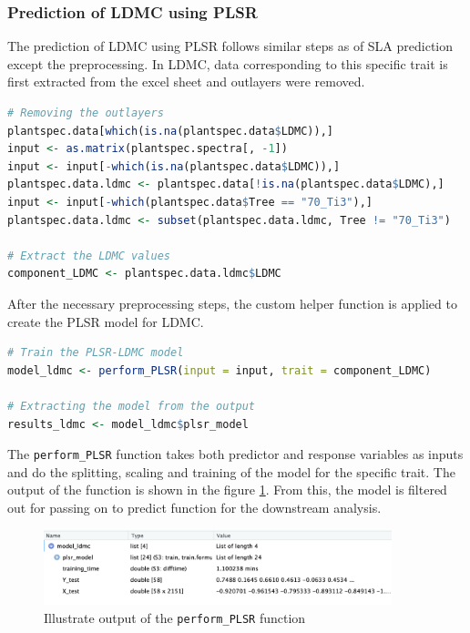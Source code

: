 \documentclass[12pt,a4paper]{report}
\begin{document}
\subsubsection*{Prediction of LDMC using PLSR}
The prediction of LDMC using PLSR follows similar steps as of SLA prediction except the preprocessing. In LDMC, data corresponding to this specific trait is first extracted from the excel sheet and outlayers were removed.

\begin{lstlisting}[language=R, style=mystyle]
# Removing the outlayers
plantspec.data[which(is.na(plantspec.data$LDMC)),]
input <- as.matrix(plantspec.spectra[, -1])
input <- input[-which(is.na(plantspec.data$LDMC)),]
plantspec.data.ldmc <- plantspec.data[!is.na(plantspec.data$LDMC),]
input <- input[-which(plantspec.data$Tree == "70_Ti3"),]
plantspec.data.ldmc <- subset(plantspec.data.ldmc, Tree != "70_Ti3")

# Extract the LDMC values
component_LDMC <- plantspec.data.ldmc$LDMC
\end{lstlisting}

After the necessary preprocessing steps, the custom helper function is applied to create the PLSR model for LDMC.

\begin{lstlisting}[language=R, style=mystyle]
# Train the PLSR-LDMC model
model_ldmc <- perform_PLSR(input = input, trait = component_LDMC)

# Extracting the model from the output
results_ldmc <- model_ldmc$plsr_model
\end{lstlisting}

The \texttt{perform\_PLSR} function takes both predictor and response variables as inputs and do the splitting, scaling and training of the model for the specific trait. The output of the function is shown in the figure \ref{fig:model_ldmc}. From this, the model is filtered out for passing on to predict function for the downstream analysis.

\begin{figure}[h]
    \centering
    \includegraphics[width=0.9\textwidth]{Figures/model_ldmc.png}
    \caption{Illustrate output of the \texttt{perform\_PLSR} function}
    \label{fig:model_ldmc}
\end{figure}
\end{document}
